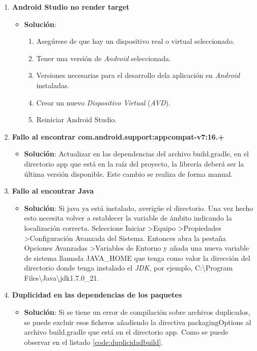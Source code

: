 	\begin{enumerate}
		\item {\bf Android Studio no render target}
			\begin{itemize}
				\item {\bf Solución}:
					\begin{enumerate}
						\item Asegúrese de que hay un dispositivo real o virtual seleccionado.
						\item Tener una versión de {\it Android} seleccionada.
						\item Versiones necesarias para el desarrollo dela aplicación en {\it Android} instaladas.
						\item Crear un nuevo {\it Dispositivo Virtual} ({\it AVD}).
						\item Reiniciar Android Studio.
					\end{enumerate}
			\end{itemize}
		
		\item {\bf Fallo al encontrar com.android.support:appcompat-v7:16.+}
			\begin{itemize}
				\item {\bf Solución}: Actualizar en las dependencias del archivo {\ttfamily build.gradle}, en el directorio {\ttfamily app} que está en la raíz del proyecto, la librería deberá ser la última versión disponible. Este cambio se realiza de forma manual.
			\end{itemize}
		
		\item {\bf Fallo al encontrar Java}
			\begin{itemize}
				\item {\bf Solución}: Si java ya está instalado, averigüe el directorio. Una vez hecho esto necesita volver a establecer la variable de ámbito indicando la localización correcta. Seleccione {\ttfamily Iniciar \textgreater Equipo \textgreater Propiedades \textgreater Configuración Avanzada del Sistema}.
				Entonces abra la pestaña {\ttfamily Opciones Avanzadas \textgreater Variables de Entorno} y añada una nueva variable de sistema llamada {\ttfamily JAVA\_HOME} que  tenga como valor la dirección del directorio donde tenga instalado el {\it JDK}, por ejemplo, {\ttfamily C:{\textbackslash}Program Files{\textbackslash}Java{\textbackslash}jdk1.7.0\_21}. 
			\end{itemize}
		\item {\bf Duplicidad en las dependencias de los paquetes}
			\begin{itemize}
				\item {\bf Solución}: Si se tiene un error de compilación sobre archivos duplicados, se puede excluir esos ficheros añadiendo la directiva {\ttfamily packagingOptions} al archivo {\ttfamily build.gradle} que está en el directorio {\ttfamily app}. Como se puede observar en el listado \ref{code:duplicidadbuild}.
				

\end{itemize}
\end{enumerate}
